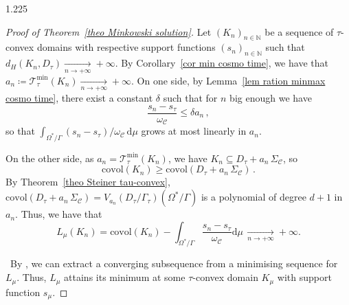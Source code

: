 \documentclass[reqno, a4paper]{amsart}
\numberwithin{equation}{section}
\numberwithin{figure}{section}
\theoremstyle{definition}
\theoremstyle{remark}
\newcommand{\N}{\mathbb{N}} %
\newcommand{\dif}{\mathrm{d}} %
\newcommand{\C}{\mathcal{C}} %
\renewcommand{\S}{\Sigma_\C} %
\newcommand{\covol}{\mathrm{covol}} %
\begin{document}
\begin{spacing}{1.225}
\begin{proof}[Proof of Theorem~\ref{theo Minkowski solution}]
Let $(K_n)_{n\in\N}$ be a sequence of $\tau$-convex domains with respective support functions $(s_n)_{n\in\N}$ such that $d_H(K_n,D_\tau)\xrightarrow[n\to+\infty]{}+\infty$. By Corollary~\ref{cor min cosmo time}, we have that $a_n\coloneqq \mathcal{T}_\tau^{\min}(K_n) \xrightarrow[n\to+\infty]{}+\infty$. On one side, by Lemma~\ref{lem ration minmax cosmo time}, there exist a constant $\delta$ such that for $n$ big enough we have 
\begin{equation*}
 \frac{s_n-s_\tau}{\omega_\C} \leq \delta a_n \, ,
\end{equation*}
so that $\int_{\Omega^*/\Gamma} (s_n-s_\tau)/ \omega_\C \, \dif \mu$ grows at most linearly in $a_n$. 

On the other side, as $a_n = \mathcal{T}_\tau^{\min}(K_n)$, we have $ K_n \subseteq D_\tau + a_n \, \S$, so
\begin{equation*}
 \covol(K_n) \geq \covol(D_\tau + a_n \, \S) \, . 
\end{equation*}
By Theorem~\ref{theo Steiner tau-convex}, $\covol(D_\tau + a_n \, \S) = V_{a_n}(D_\tau/\Gamma_\tau)(\Omega^*/\Gamma)$ is a polynomial of degree $d+1$ in $a_n$. Thus, we have that 
\begin{equation*}
 L_\mu(K_n) = \covol(K_n) - \int_{\Omega^*/\Gamma} \frac{s_n-s_\tau}{\omega_\C} \dif \mu \, \xrightarrow[n\to+\infty]{}+\infty. 
 \end{equation*}

\noindent \textbullet\ By {\cite[Theorem~10.9]{Rockafellar_97}}, we can extract a converging subsequence from a minimising sequence for $L_\mu$. Thus, $L_\mu$ attains its minimum at some $\tau$-convex domain $K_\mu$ with support function $s_\mu$. 


\end{proof}
\end{spacing}
\end{document}
